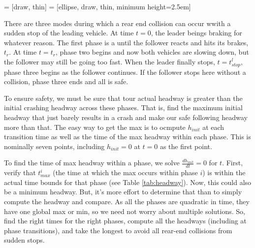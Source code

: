 \documentclass{article}
\begin{document}
 = [draw, thin]
 = [ellipse, draw, thin, minimum height=2.5em]

There are three modes during which a rear end collision can occur wwith a sudden stop of the leading vehicle.  At time $t=0$, the leader beings braking for whatever reason.  The first phase is a until the follower reacts and hits its brakes, $t_r$.  At time $t=t_r$, phase two begins and now both vehicles are slowing down, but the follower may still be going too fast.  When the leader finally stops, $t=t_{stop}^l$, phase three begins as the follower continues.  If the follower stops here without a collision, phase three ends and all is safe.

To ensure safety, we must be sure that tour actual headway is greater than the initial crashing headway across these phases.  That is, find the maximum initial headway that just barely results in a crash and make our safe following headway more than that.  The easy way to get the max is to ocmpute $h_{init}$ at each transition time as well as the time of the max headway within each phase.  This is nominally seven points, including $h_{init} = 0$ at $t=0$ as the first point.

To find the time of max headway within a phase, we solve $\frac{dh_{init}}{dt} = 0$ for $t$.  First, verify that $t_{max}^i$ (the time at which the max occurs within phase $i$) is within the actual time bounds for that phase (see Table \ref{tab:headway}).  Now, this could also be a minimum headway.  But, it's more effort to determine that than to simply compute the headway and compare.  As all the phases are quadratic in time, they have one global max or min, so we need not worry about multiple solutions.  So, find the right times for the right phases, compute all the headways (including at phase transitions), and take the longest to avoid all rear-end collisions from sudden stops.
\end{document}
